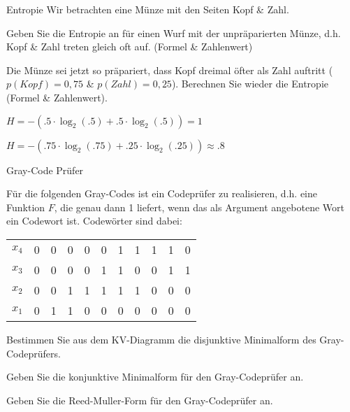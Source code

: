 \documentclass{exercisesheet}
\begin{document}
\begin{eexercises}{Entropie}{
    Wir betrachten eine Münze mit den Seiten Kopf \& Zahl.
  }
  \item Geben Sie die Entropie an für einen Wurf mit der unpräparierten Münze, d.h. Kopf \& Zahl treten gleich oft auf. (Formel \& Zahlenwert)
  \item Die Münze sei jetzt so präpariert, dass Kopf dreimal öfter als Zahl auftritt ($p(Kopf) = 0,75$ \& $p(Zahl) = 0,25$). Berechnen Sie wieder die Entropie (Formel \& Zahlenwert).
\end{eexercises}

\begin{solutions}
  \item $H = -(.5\cdot\log_2(.5) + .5\cdot\log_2(.5)) = 1$
  \item $H = -(.75\cdot\log_2(.75) + .25\cdot\log_2(.25)) \approx .8$
\end{solutions}

\begin{eexercises}{Gray-Code Prüfer}{
    Für die folgenden Gray-Codes ist ein Codeprüfer zu realisieren, d.h. eine Funktion $F$, die genau dann 1 liefert, wenn das als Argument angebotene Wort ein Codewort ist. Codewörter sind dabei:\par
    \begin{tabular}{c|cccc cccc cc}
      $x_4$ & 0 & 0 & 0 & 0 & 0 & 1 & 1 & 1 & 1 & 0 \\
      $x_3$ & 0 & 0 & 0 & 0 & 1 & 1 & 0 & 0 & 1 & 1 \\
      $x_2$ & 0 & 0 & 1 & 1 & 1 & 1 & 1 & 0 & 0 & 0 \\
      $x_1$ & 0 & 1 & 1 & 0 & 0 & 0 & 0 & 0 & 0 & 0 \\
    \end{tabular}
  }
  \item Bestimmen Sie aus dem KV-Diagramm die disjunktive Minimalform des Gray-Codeprüfers.
  \item Geben Sie die konjunktive Minimalform für den Gray-Codeprüfer an.
  \item Geben Sie die Reed-Muller-Form für den Gray-Codeprüfer an.\par
\end{eexercises}
\end{document}
